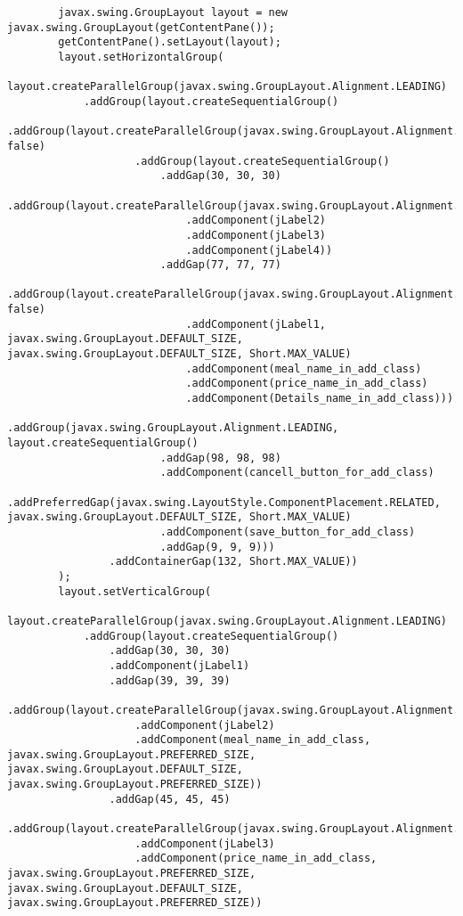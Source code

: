 \documentclass[12pt,a4paper]{article}
\begin{document}
\begin{lstlisting}
        javax.swing.GroupLayout layout = new javax.swing.GroupLayout(getContentPane());
        getContentPane().setLayout(layout);
        layout.setHorizontalGroup(
            layout.createParallelGroup(javax.swing.GroupLayout.Alignment.LEADING)
            .addGroup(layout.createSequentialGroup()
                .addGroup(layout.createParallelGroup(javax.swing.GroupLayout.Alignment.TRAILING, false)
                    .addGroup(layout.createSequentialGroup()
                        .addGap(30, 30, 30)
                        .addGroup(layout.createParallelGroup(javax.swing.GroupLayout.Alignment.LEADING)
                            .addComponent(jLabel2)
                            .addComponent(jLabel3)
                            .addComponent(jLabel4))
                        .addGap(77, 77, 77)
                        .addGroup(layout.createParallelGroup(javax.swing.GroupLayout.Alignment.LEADING, false)
                            .addComponent(jLabel1, javax.swing.GroupLayout.DEFAULT_SIZE, javax.swing.GroupLayout.DEFAULT_SIZE, Short.MAX_VALUE)
                            .addComponent(meal_name_in_add_class)
                            .addComponent(price_name_in_add_class)
                            .addComponent(Details_name_in_add_class)))
                    .addGroup(javax.swing.GroupLayout.Alignment.LEADING, layout.createSequentialGroup()
                        .addGap(98, 98, 98)
                        .addComponent(cancell_button_for_add_class)
                        .addPreferredGap(javax.swing.LayoutStyle.ComponentPlacement.RELATED, javax.swing.GroupLayout.DEFAULT_SIZE, Short.MAX_VALUE)
                        .addComponent(save_button_for_add_class)
                        .addGap(9, 9, 9)))
                .addContainerGap(132, Short.MAX_VALUE))
        );
        layout.setVerticalGroup(
            layout.createParallelGroup(javax.swing.GroupLayout.Alignment.LEADING)
            .addGroup(layout.createSequentialGroup()
                .addGap(30, 30, 30)
                .addComponent(jLabel1)
                .addGap(39, 39, 39)
                .addGroup(layout.createParallelGroup(javax.swing.GroupLayout.Alignment.BASELINE)
                    .addComponent(jLabel2)
                    .addComponent(meal_name_in_add_class, javax.swing.GroupLayout.PREFERRED_SIZE, javax.swing.GroupLayout.DEFAULT_SIZE, javax.swing.GroupLayout.PREFERRED_SIZE))
                .addGap(45, 45, 45)
                .addGroup(layout.createParallelGroup(javax.swing.GroupLayout.Alignment.LEADING)
                    .addComponent(jLabel3)
                    .addComponent(price_name_in_add_class, javax.swing.GroupLayout.PREFERRED_SIZE, javax.swing.GroupLayout.DEFAULT_SIZE, javax.swing.GroupLayout.PREFERRED_SIZE))

\end{lstlisting}
\end{document}
